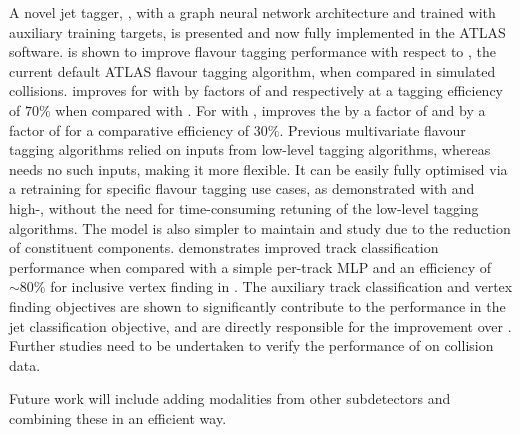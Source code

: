 A novel jet tagger, \GNN, with a graph neural network architecture and trained with auxiliary training targets, is presented and now fully implemented in the ATLAS software.
\GNN is shown to improve flavour tagging performance with respect to \DLr, the current default ATLAS flavour tagging algorithm, when compared in simulated collisions.
\GNN improves \clrej for \ttbarjets with \ttbarpt by factors of \ttbclo and \ttbllo respectively at a \bjet tagging efficiency of $70\%$ when compared with \DLr.
For \Zprimejets with \Zprimept, \GNN improves the \crej by a factor of \zpbclo and \lrej by a factor of \zpbllo for a comparative \bjet efficiency of $30\%$.
Previous multivariate flavour tagging algorithms relied on inputs from low-level tagging algorithms, whereas \GNN needs no such inputs, making it more flexible. It can be easily fully optimised via a retraining for specific flavour tagging use cases, as demonstrated with \ctag and high-\pt \btag, without the need for time-consuming retuning of the low-level tagging algorithms.
The model is also simpler to maintain and study due to the reduction of constituent components.
\GNN demonstrates improved track classification performance when compared with a simple per-track MLP and an efficiency of $\sim80\%$ for inclusive vertex finding in \bjets.
The auxiliary track classification and vertex finding objectives are shown to significantly contribute to the performance in the jet classification objective, and are directly responsible for the improvement over \DLr.
Further studies need to be undertaken to verify the performance of \GNN on collision data.

Future work will include adding modalities from other subdetectors and combining these in an efficient way.